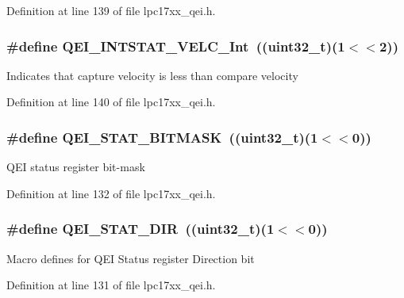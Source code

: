 \-Definition at line 139 of file lpc17xx\-\_\-qei.\-h.

\hypertarget{group___q_e_i___private___macros_ga12c00ccf1cf4ae28ffa78f2f34ea1982}{
\subsubsection[{\-Q\-E\-I\-\_\-\-I\-N\-T\-S\-T\-A\-T\-\_\-\-V\-E\-L\-C\-\_\-\-Int}]{\setlength{\rightskip}{0pt plus 5cm}\#define {\bf \-Q\-E\-I\-\_\-\-I\-N\-T\-S\-T\-A\-T\-\_\-\-V\-E\-L\-C\-\_\-\-Int}~((uint32\-\_\-t)(1$<$$<$2))}}\label{group___q_e_i___private___macros_ga12c00ccf1cf4ae28ffa78f2f34ea1982}
\-Indicates that capture velocity is less than compare velocity 

\-Definition at line 140 of file lpc17xx\-\_\-qei.\-h.

\hypertarget{group___q_e_i___private___macros_ga1ab9a99635f383ad2a3635088a7027cc}{
\subsubsection[{\-Q\-E\-I\-\_\-\-S\-T\-A\-T\-\_\-\-B\-I\-T\-M\-A\-S\-K}]{\setlength{\rightskip}{0pt plus 5cm}\#define {\bf \-Q\-E\-I\-\_\-\-S\-T\-A\-T\-\_\-\-B\-I\-T\-M\-A\-S\-K}~((uint32\-\_\-t)(1$<$$<$0))}}\label{group___q_e_i___private___macros_ga1ab9a99635f383ad2a3635088a7027cc}
\-Q\-E\-I status register bit-\/mask 

\-Definition at line 132 of file lpc17xx\-\_\-qei.\-h.

\hypertarget{group___q_e_i___private___macros_gaae76578f42bda5774a39bb774fcf4fbf}{
\subsubsection[{\-Q\-E\-I\-\_\-\-S\-T\-A\-T\-\_\-\-D\-I\-R}]{\setlength{\rightskip}{0pt plus 5cm}\#define {\bf \-Q\-E\-I\-\_\-\-S\-T\-A\-T\-\_\-\-D\-I\-R}~((uint32\-\_\-t)(1$<$$<$0))}}\label{group___q_e_i___private___macros_gaae76578f42bda5774a39bb774fcf4fbf}
\-Macro defines for \-Q\-E\-I \-Status register \-Direction bit 

\-Definition at line 131 of file lpc17xx\-\_\-qei.\-h.

